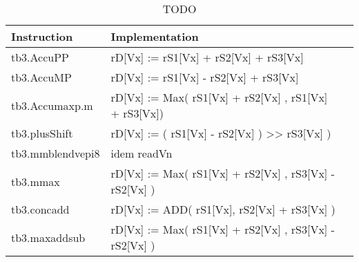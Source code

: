 
\begin{table}[tb]
  \centering
  
      \begin{tabular}{l || l l }
      \toprule
      Instruction & Implementation 
      \\ \midrule
      tb3.AccuPP        & rD[Vx] := rS1[Vx] + rS2[Vx] + rS3[Vx] \\ \midrule
      tb3.AccuMP        & rD[Vx] := rS1[Vx] - rS2[Vx] + rS3[Vx] \\ \midrule
      tb3.Accumaxp.m  & rD[Vx] := Max( rS1[Vx] + rS2[Vx] , rS1[Vx] + rS3[Vx]) \\ \midrule
      tb3.plusShift     & rD[Vx] := ( rS1[Vx] - rS2[Vx] ) >> rS3[Vx] ) \\ \midrule 
      tb3.mmblendvepi8& idem readVn \\ \midrule
      tb3.mmax          & rD[Vx] := Max( rS1[Vx] + rS2[Vx] , rS3[Vx] - rS2[Vx] ) \\ \midrule
      tb3.concadd      & rD[Vx] := ADD( rS1[Vx],  rS2[Vx] + rS3[Vx] ) \\ \midrule
      tb3.maxaddsub   & rD[Vx] := Max( rS1[Vx] + rS2[Vx] , rS3[Vx] - rS2[Vx] ) \\ 
      \bottomrule
      \end{tabular}
  
  \caption{TODO}
  \label{tab:instrus_turbo_3reg}
  \end{table}
